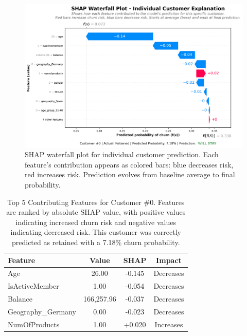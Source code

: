 \documentclass[12pt]{article}
\begin{document}
\begin{figure}[H]
\centering
\includegraphics[width=\textwidth]{img/26_shap_waterfall.png}
\caption{SHAP waterfall plot for individual customer prediction. Each feature's contribution appears as colored bars: blue decreases risk, red increases risk. Prediction evolves from baseline average to final probability.}
\label{fig:shap_waterfall}
\end{figure}

\begin{table}[H]
\centering
\small
\caption{Top 5 Contributing Features for Customer \#0. Features are ranked by absolute SHAP value, with positive values indicating increased churn risk and negative values indicating decreased risk. This customer was correctly predicted as retained with a 7.18\% churn probability.}
\label{tab:shap_top5}
\begin{tabular}{lccc}
\toprule
\textbf{Feature} & \textbf{Value} & \textbf{SHAP} & \textbf{Impact} \\
\midrule
Age & 26.00 & -0.145 & Decreases \\
IsActiveMember & 1.00 & -0.054 & Decreases \\
Balance & 166,257.96 & -0.037 & Decreases \\
Geography\_Germany & 0.00 & -0.023 & Decreases \\
NumOfProducts & 1.00 & +0.020 & Increases \\
\bottomrule
\end{tabular}
\end{table}
\end{document}
